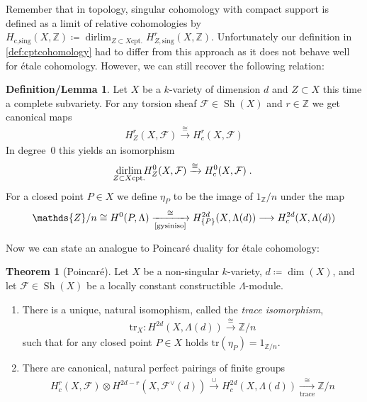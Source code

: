 \documentclass[english]{scrartcl}
\theoremstyle{definition}
\newtheorem{DefLem}[Def]{Definition/Lemma}
\newtheorem{Thm}[Def]{Theorem}
\theoremstyle{remark}
\newcommand*{\Z}{\mathds{Z}}
\newcommand*{\Zmod}[1]{\Z/#1} %
\newcommand*{\F}{\mathcal{F}} %
\DeclareMathOperator*{\dirlim}{dirlim} %
\DeclareMathOperator{\Sh}{Sh} %
\newcommand*{\Tr}{\text{tr}} %
\newcommand*{\tr}[1]{\Tr\left(#1\right)} %
\begin{document}
Remember that in topology, singular cohomology with compact support is
defined as a limit of relative cohomologies by
$H_{\text{c,sing}}(X,\Z)\coloneqq
\dirlim_{Z\subset X \text{cpt.}}H_{Z,\text{sing}}^r(X,\Z)$.
Unfortunately our definition in \ref{def:cptcohomology} had to differ from
this approach as it does not behave well for étale cohomology.
However, we can still recover the following relation:
\begin{DefLem}\label{def:etapoint}
  Let $X$ be a $k$-variety of dimension $d$ and $Z\subset X$ this time
  a complete subvariety. For any torsion sheaf $\F\in\Sh(X)$ and
  $r\in\Z$ we get canonical maps
  \begin{gather*}
    H_Z^r(X,\F)\xrightarrow{\cong} H_c^r(X,\F)
  \end{gather*}
  In degree~0 this yields an isomorphism
  \begin{gather*}
    \dirlim_{\mathclap{Z\subset X \text{cpt.}}} H_Z^0(X,\F) 
    \xrightarrow{\cong} H_c^0(X,\F)\;.
  \end{gather*}
  For a closed point $P\in X$ we define $\eta_P$ to be the image of
  $1_\Zmod{n}$ under the map
  \begin{gather*}
    \Zmod{n}
    \cong H^0(P,\Lambda)
    \xrightarrow[\text{\ref{gysiniso}}]{\cong}
    H_{\{P\}}^{2d}(X,\Lambda(d))
    \longrightarrow H_c^{2d}(X,\Lambda(d))
  \end{gather*}
\end{DefLem}

Now we can state an analogue to Poincaré duality for étale cohomology:
\begin{Thm}[Poincaré]\label{poincare}
  Let $X$ be a non-singular $k$-variety,
  $d\coloneqq\dim(X)$,
  and let $\F\in\Sh(X)$ be a locally constant constructible
  $\Lambda$-module.
  \begin{enumerate}
  \item There is a unique, natural isomophism,
    called the \emph{trace isomorphism},
    \begin{gather*}
      \Tr_X\colon H^{2d}(X,\Lambda(d)) \xrightarrow{\cong} \Zmod{n}
    \end{gather*}
    such that for any closed point $P\in X$ holds
    $\tr{\eta_P}=1_{\Zmod{n}}$.
  \item There are canonical, natural perfect pairings of finite groups
    \begin{gather*}
      H_c^r(X,\F) \otimes H^{2d-r}\left(X,\F^\vee(d)\right)
      \overset\cup\longrightarrow H_c^{2d}(X,\Lambda(d))
      \xrightarrow[\text{trace}]{\cong} \Zmod{n}
    \end{gather*}
  \end{enumerate}
\end{Thm}
\end{document}
